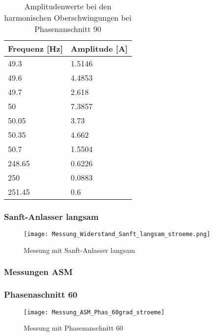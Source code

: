 \begin{table}[ht!]
	\centering
	\begin{tabular}{|l|l|}
		\hline
		Frequenz {[}Hz{]} & Amplitude {[}A{]} \\ \hline
		49.3              & 1.5146            \\ \hline
		49.6              & 4.4853            \\ \hline
		49.7              & 2.618             \\ \hline
		50                & 7.3857            \\ \hline
		50.05             & 3.73              \\ \hline
		50.35             & 4.662             \\ \hline
		50.7              & 1.5504            \\ \hline
		248.65            & 0.6226            \\ \hline
		250               & 0.0883            \\ \hline
		251.45            & 0.6               \\ \hline
	\end{tabular}
	\caption{Amplitudenwerte bei den harmonischen Oberschwingungen bei Phasenanschnitt 90\textdegree}\label{tab:Sanft_stroeme}
\end{table}




\newpage
\subsubsection*{Sanft-Anlasser langsam}
\begin{figure}[ht!]
	\centering
	\texttt{[image: Messung\_Widerstand\_Sanft\_langsam\_stroeme.png]}	
	\caption{Messung mit Sanft-Anlasser langsam}\label{fig:Mess_Widerstand_Sanft_langsam_stroeme}
\end{figure}


\newpage
\subsubsection{Messungen ASM}

\subsubsection*{Phasenaschnitt 60\textdegree}
\begin{figure}[ht!]
	\centering
	\texttt{[image: Messung\_ASM\_Phas\_60grad\_stroeme]}	
	\caption{Messung mit Phasenanschnitt 60\textdegree}\label{fig:Mess_Phas_60grad_stroeme}
\end{figure}

